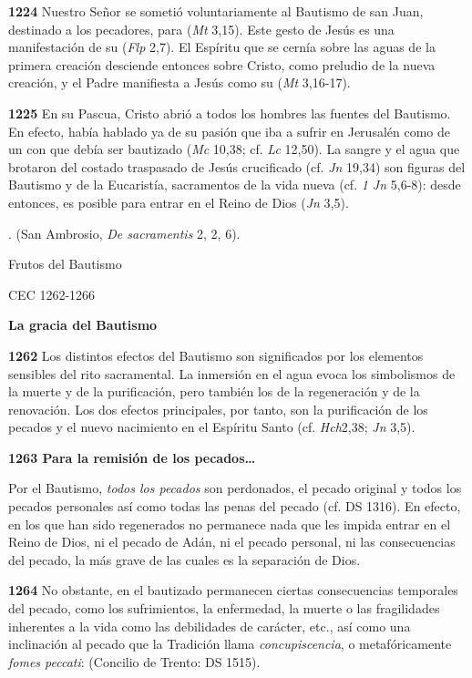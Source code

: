 {\textbf{1224} Nuestro Señor se sometió voluntariamente al Bautismo de san Juan, destinado a los pecadores, para  (\emph{Mt} 3,15). Este gesto de Jesús es una manifestación de su  (\emph{Flp} 2,7). El Espíritu que se cernía sobre las aguas de la primera creación desciende entonces sobre Cristo, como preludio de la nueva creación, y el Padre manifiesta a Jesús como su  (\emph{Mt} 3,16-17).

\textbf{1225} En su Pascua, Cristo abrió a todos los hombres las fuentes del Bautismo. En efecto, había hablado ya de su pasión que iba a sufrir en Jerusalén como de un  con que debía ser bautizado (\emph{Mc} 10,38; cf. \emph{Lc} 12,50). La sangre y el agua que brotaron del costado traspasado de Jesús crucificado (cf. \emph{Jn} 19,34) son figuras del Bautismo y de la Eucaristía, sacramentos de la vida nueva (cf. \emph{1 Jn} 5,6-8): desde entonces, es posible  para entrar en el Reino de Dios (\emph{Jn} 3,5).

. (San Ambrosio, \emph{De sacramentis} 2, 2, 6).

Frutos del Bautismo

CEC 1262-1266

\textbf{La gracia del Bautismo}

\textbf{1262} Los distintos efectos del Bautismo son significados por los elementos sensibles del rito sacramental. La inmersión en el agua evoca los simbolismos de la muerte y de la purificación, pero también los de la regeneración y de la renovación. Los dos efectos principales, por tanto, son la purificación de los pecados y el nuevo nacimiento en el Espíritu Santo (cf. \emph{Hch}2,38; \emph{Jn} 3,5).

\textbf{1263 Para la remisión de los pecados\ldots{}}

Por el Bautismo, \emph{todos los pecados} son perdonados, el pecado original y todos los pecados personales así como todas las penas del pecado (cf. DS 1316). En efecto, en los que han sido regenerados no permanece nada que les impida entrar en el Reino de Dios, ni el pecado de Adán, ni el pecado personal, ni las consecuencias del pecado, la más grave de las cuales es la separación de Dios.

\textbf{1264} No obstante, en el bautizado permanecen ciertas consecuencias temporales del pecado, como los sufrimientos, la enfermedad, la muerte o las fragilidades inherentes a la vida como las debilidades de carácter, etc., así como una inclinación al pecado que la Tradición llama \emph{concupiscencia}, o metafóricamente \emph{fomes peccati}:  (Concilio de Trento: DS 1515).

}
